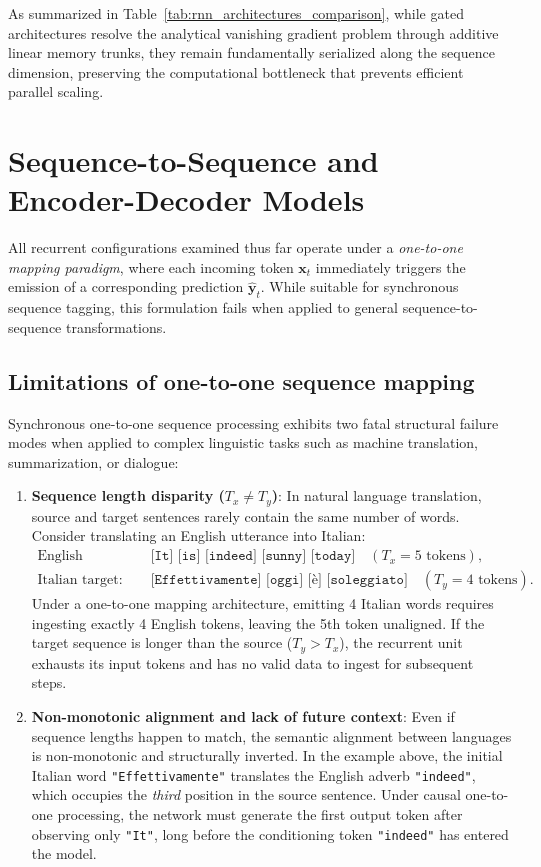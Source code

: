 \documentclass[../../../main.tex]{subfiles}
\begin{document}
As summarized in Table~\ref{tab:rnn_architectures_comparison}, while gated architectures resolve the analytical vanishing gradient problem through additive linear memory trunks, they remain fundamentally serialized along the sequence dimension, preserving the computational bottleneck that prevents efficient parallel scaling.

\clearpage
\section{Sequence-to-Sequence and Encoder-Decoder Models}
\label{sec:rnn_seq2seq_bottleneck}

All recurrent configurations examined thus far operate under a \textit{one-to-one mapping paradigm}, where each incoming token $\mathbf{x}_t$ immediately triggers the emission of a corresponding prediction $\hat{\mathbf{y}}_t$. While suitable for synchronous sequence tagging, this formulation fails when applied to general sequence-to-sequence transformations.

\subsection{Limitations of one-to-one sequence mapping}
\label{subsec:rnn_limitations_one_to_one}

Synchronous one-to-one sequence processing exhibits two fatal structural failure modes when applied to complex linguistic tasks such as machine translation, summarization, or dialogue:
\begin{enumerate}
    \item \textbf{Sequence length disparity ($T_x \neq T_y$)}: In natural language translation, source and target sentences rarely contain the same number of words. Consider translating an English utterance into Italian:
    \begin{align}
    \text{English source: } & \quad \texttt{[It] [is] [indeed] [sunny] [today]} \quad (T_x = 5 \text{ tokens}), \\
    \text{Italian target: } & \quad \texttt{[Effettivamente] [oggi] [è] [soleggiato]} \quad (T_y = 4 \text{ tokens}).
    \end{align}
    Under a one-to-one mapping architecture, emitting 4 Italian words requires ingesting exactly 4 English tokens, leaving the 5th token unaligned. If the target sequence is longer than the source ($T_y > T_x$), the recurrent unit exhausts its input tokens and has no valid data to ingest for subsequent steps.
    
    \item \textbf{Non-monotonic alignment and lack of future context}: Even if sequence lengths happen to match, the semantic alignment between languages is non-monotonic and structurally inverted. In the example above, the initial Italian word \texttt{"Effettivamente"} translates the English adverb \texttt{"indeed"}, which occupies the \textit{third} position in the source sentence. Under causal one-to-one processing, the network must generate the first output token after observing only \texttt{"It"}, long before the conditioning token \texttt{"indeed"} has entered the model.
\end{enumerate}
\end{document}
